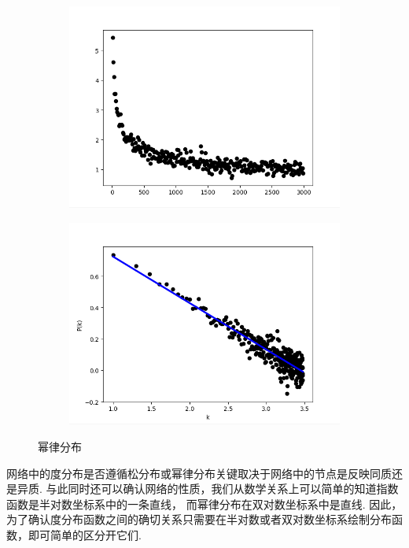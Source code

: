\documentclass[bachelor,adobefonts]{jnuthesis}
\begin{document}
\begin{figure}[h!]
  \centering
    \begin{subfigure}[b]{0.4\linewidth}
      \includegraphics[width=\linewidth]{Wmilv.png}
      \caption{}
    \end{subfigure}
    \begin{subfigure}[b]{0.4\linewidth}
      \includegraphics[width=\linewidth]{WmilvN.png}
      \caption{}
    \end{subfigure}
  \caption{幂律分布}
\end{figure}


网络中的度分布\cite{Kong2012Markov, Hou2009Degree}是否遵循松分布或幂律分布关键取决于网络中的节点是反映同质还是异质.
与此同时还可以确认网络的性质，我们从数学关系上可以简单的知道指数函数是半对数坐标系中的一条直线，
而幂律分布在双对数坐标系中是直线.
因此，为了确认度分布函数之间的确切关系只需要在半对数或者双对数坐标系绘制分布函数，即可简单的区分开它们.
\end{document}
